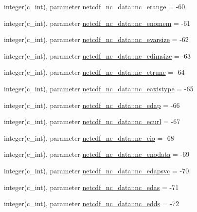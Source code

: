 \begin{DoxyCompactItemize}
\item 
integer(c\+\_\+int), parameter \hyperlink{namespacenetcdf__nc__data_aac3d60689bcec8bf0eb3450d445eab46}{netcdf\+\_\+nc\+\_\+data\+::nc\+\_\+erange} = -\/60
\item 
integer(c\+\_\+int), parameter \hyperlink{namespacenetcdf__nc__data_a80cce55761ff64b987641fe6f2e05821}{netcdf\+\_\+nc\+\_\+data\+::nc\+\_\+enomem} = -\/61
\item 
integer(c\+\_\+int), parameter \hyperlink{namespacenetcdf__nc__data_a59fa828790c0a023fd1599da7ec76a8b}{netcdf\+\_\+nc\+\_\+data\+::nc\+\_\+evarsize} = -\/62
\item 
integer(c\+\_\+int), parameter \hyperlink{namespacenetcdf__nc__data_a00bc858d354d8005d17b50e0634119cd}{netcdf\+\_\+nc\+\_\+data\+::nc\+\_\+edimsize} = -\/63
\item 
integer(c\+\_\+int), parameter \hyperlink{namespacenetcdf__nc__data_a9d18fecf9930af7fe5f7120637546b63}{netcdf\+\_\+nc\+\_\+data\+::nc\+\_\+etrunc} = -\/64
\item 
integer(c\+\_\+int), parameter \hyperlink{namespacenetcdf__nc__data_af7013322b1cad29cb08115055161b135}{netcdf\+\_\+nc\+\_\+data\+::nc\+\_\+eaxistype} = -\/65
\item 
integer(c\+\_\+int), parameter \hyperlink{namespacenetcdf__nc__data_a45770cfd01d969718e0b364d475790c6}{netcdf\+\_\+nc\+\_\+data\+::nc\+\_\+edap} = -\/66
\item 
integer(c\+\_\+int), parameter \hyperlink{namespacenetcdf__nc__data_a324478369df20d472575fd95ebcff1e2}{netcdf\+\_\+nc\+\_\+data\+::nc\+\_\+ecurl} = -\/67
\item 
integer(c\+\_\+int), parameter \hyperlink{namespacenetcdf__nc__data_ad4cd38f0b1af055f833c9fd514c8c53c}{netcdf\+\_\+nc\+\_\+data\+::nc\+\_\+eio} = -\/68
\item 
integer(c\+\_\+int), parameter \hyperlink{namespacenetcdf__nc__data_a09e4229d656b07b898b8df41c179bdfb}{netcdf\+\_\+nc\+\_\+data\+::nc\+\_\+enodata} = -\/69
\item 
integer(c\+\_\+int), parameter \hyperlink{namespacenetcdf__nc__data_aef772139dee477b025ac854248d88196}{netcdf\+\_\+nc\+\_\+data\+::nc\+\_\+edapsvc} = -\/70
\item 
integer(c\+\_\+int), parameter \hyperlink{namespacenetcdf__nc__data_ac5a55bad25b5ba22b277c485abd35d61}{netcdf\+\_\+nc\+\_\+data\+::nc\+\_\+edas} = -\/71
\item 
integer(c\+\_\+int), parameter \hyperlink{namespacenetcdf__nc__data_a6cfc318dec516ce1e69d192810250b9b}{netcdf\+\_\+nc\+\_\+data\+::nc\+\_\+edds} = -\/72

\end{DoxyCompactItemize}

